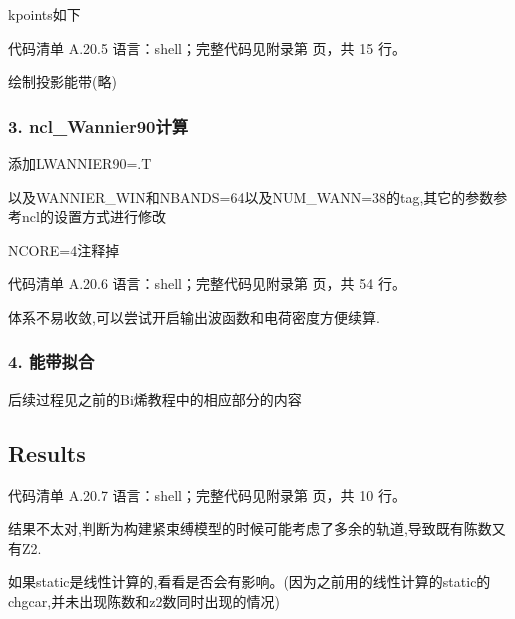 \documentclass[lang=cn,scheme=chinese,color=blue,device=normal,toc=onecol,math=cm]{elegantbook}
\begin{document}
kpoints如下\par


\begin{codeindexbox}{代码清单 A.20.5}
语言：shell；完整代码见附录第 \pageref{code:20:5} 页，共 15 行。
\end{codeindexbox}


绘制投影能带(略)\par


\subsubsection{3. ncl\_\allowbreak{}Wannier90计算}


添加LWANNIER90=.T\par


以及WANNIER\_\allowbreak{}WIN和NBANDS=64以及NUM\_\allowbreak{}WANN=38的tag,其它的参数参考ncl的设置方式进行修改\par


NCORE=4注释掉\par


\begin{codeindexbox}{代码清单 A.20.6}
语言：shell；完整代码见附录第 \pageref{code:20:6} 页，共 54 行。
\end{codeindexbox}


体系不易收敛,可以尝试开启输出波函数和电荷密度方便续算.\par


\subsubsection{4. 能带拟合}


后续过程见之前的Bi烯教程中的相应部分的内容\par


\subsection{Results}


\begin{codeindexbox}{代码清单 A.20.7}
语言：shell；完整代码见附录第 \pageref{code:20:7} 页，共 10 行。
\end{codeindexbox}


结果不太对,判断为构建紧束缚模型的时候可能考虑了多余的轨道,导致既有陈数又有Z2.\par


如果static是线性计算的,看看是否会有影响。(因为之前用的线性计算的static的chgcar,并未出现陈数和z2数同时出现的情况)\par
\end{document}
